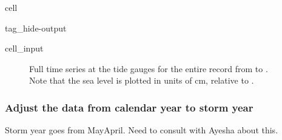 \documentclass[letterpaper,10pt,english]{jupyterBook}
\begin{document}
\begin{sphinxuseclass}{cell}
\begin{sphinxuseclass}{tag_hide-output}
\begin{sphinxVerbatimInput}
\begin{sphinxuseclass}{cell_input}
\begin{sphinxVerbatim}[commandchars=\\\{\}]
\PYG{p}{[} \PYG{p}{]}



\end{sphinxVerbatim}

\end{sphinxuseclass}\end{sphinxVerbatimInput}

\end{sphinxuseclass}
\end{sphinxuseclass}
\begin{figure}[htbp]
\centering
\capstart

\noindent{}
\caption{Full time series at the  tide gauges for the entire record from  to . Note that the sea level is plotted in units of cm, relative to .}\label{\detokenize{notebooks/FloodFrequency:fig-ts-full}}\end{figure}


\subsubsection{Adjust the data from calendar year to storm year}
\label{\detokenize{notebooks/FloodFrequency:adjust-the-data-from-calendar-year-to-storm-year}}
\sphinxAtStartPar
Storm year goes from May\sphinxhyphen{}April. Need to consult with Ayesha about this.
\end{document}
